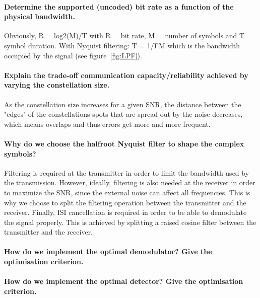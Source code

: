 \paragraph{Determine the supported (uncoded) bit rate as a function of the physical bandwidth.} Obviously, R = log2(M)/T with R = bit rate, M = number of symbols and T = symbol duration. With Nyquist filtering: T = 1/FM which is the bandwidth occupied by the signal (see figure~\ref{fig:LPF}).
\paragraph{Explain the trade-off communication capacity/reliability achieved by varying the constellation size.}
As the constellation size increases for a given SNR, the distance between the "edges" of the constellations spots that are spread out by the noise decreases, which means overlaps and thus errors get more and more frequent.
\paragraph{Why do we choose the halfroot Nyquist filter to shape the complex symbols?}
Filtering is required at the transmitter in order to limit the bandwidth used by the transmission. However, ideally, filtering is also needed at the receiver in order to maximize the SNR, since the external noise can affect all frequencies. This is why we choose to split the filtering operation between the transmitter and the receiver. Finally, ISI cancellation is required in order to be able to demodulate the signal properly. This is achieved by splitting a raised cosine filter between the transmitter and the receiver.
\paragraph{How do we implement the optimal demodulator? Give the optimisation criterion.}

\paragraph{How do we implement the optimal detector? Give the optimisation criterion.}
